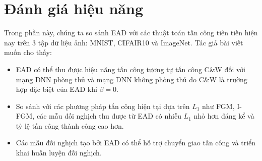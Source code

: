 \chapter{Đánh giá hiệu năng}
Trong phần này, chúng ta so sánh EAD với các thuật toán tấn công tiên tiến hiện nay trên 3 
tập dữ liệu ảnh: MNIST, CIFAIR10 và ImageNet. Tác giả bài viết muốn cho thấy:
\begin{itemize}
    \item EAD có thể thu được hiệu năng tấn công tương tự tấn công C\&W đối với mạng DNN 
    phòng thủ và mạng DNN không phòng thủ do C\&W là trường hợp đặc biệt của EAD khi 
    $\beta = 0$.
    \item So sánh với các phương pháp tấn công hiện tại dựa trên $L_1$ như FGM, I-FGM, 
    các mẫu đối nghịch thu được từ EAD có nhiễu $L_1$ nhỏ hơn đáng kể và tỷ lệ tấn công 
    thành công cao hơn.
    \item Các mẫu đối nghịch tạo bởi EAD có thể hỗ trợ chuyển giao tấn công và triển khai 
    huấn luyện đối nghịch.
\end{itemize}







